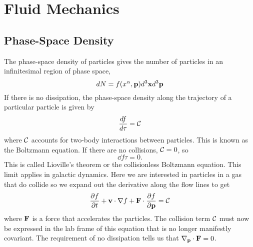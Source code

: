 \chapter{Fluid Mechanics}
\label{cha:fluid-mechanics}
\section{Phase-Space Density}
\label{sec:phase-space-density}

The phase-space density of particles gives the number of particles in
an infinitesimal region of phase space,
\begin{equation}
d N = f(x^\alpha,{\bf p}) d^3 {\bf x} d^3 {\bf p}
\label{eq:591}
\end{equation}
If there is no dissipation, the phase-space density 
along the trajectory of a particular particle
is given by
\begin{equation}
\frac{d {f}}{d {\tau}} = {\cal C}
\label{eq:592}
\end{equation}
where ${\cal C}$ accounts for two-body interactions between
particles.   This is known as the Boltzmann equation. If there are no collisions, ${\cal C}=0$, so
\begin{equation}
\dd{f}{\tau} = 0.
\label{eq:593}
\end{equation} 
This is called Lioville's theorem or the collisionless Boltzmann
equation.  This limit applies in galactic dynamics.  Here we are
interested in particles in a gas that do collide so we expand out the
derivative along the flow lines to get
\begin{equation}
\frac{\partial {f}}{\partial {t}} + {\bf v} \cdot \nabla f + {\bf F} \cdot \frac{\partial {f}}{\partial {{\bf p}}} =
   {\cal C}
\label{eq:594}
\end{equation}
where ${\bf F}$ is a force that accelerates the particles.  The
collision term ${\cal C}$ must now be expressed in the lab frame of
this equation that is no longer manifestly covariant.  The requirement
of no dissipation tells us that $\nabla_{\bf p} \cdot {\bf F} = 0$.

